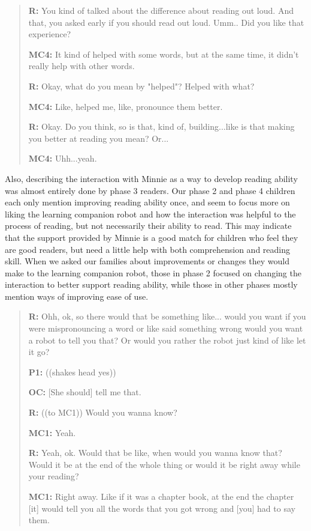 \documentclass{sigchi}
\begin{document}
	\begin{quote}
		 \vspace{2mm}
		 \textbf{R:} You kind of talked about the difference about reading out loud. And that, you asked early if you should read out loud. Umm.. Did you like that experience?
		 		 
		 \textbf{MC4:} It kind of helped with some words, but at the same time, it didn't really help with other words.
		 
		 \textbf{R:} Okay, what do you mean by "helped"? Helped with what?
		 
		 \textbf{MC4:} Like, helped me, like, pronounce them better.
		  
		 \textbf{R:} Okay. Do you think, so is that, kind of, building...like is that making you better at reading you mean? Or...
		 
		 \textbf{MC4:} Uhh...yeah. 
		 
	\end{quote}

Also, describing the interaction with Minnie as a way to develop reading ability was almost entirely done by phase 3 readers. Our phase 2 and phase 4 children each only mention improving reading ability once, and seem to focus more on liking the learning companion robot and how the interaction was helpful to the process of reading, but not necessarily their ability to read. This may indicate that the support provided by Minnie is a good match for children who feel they are good readers, but need a little help with both comprehension and reading skill. When we asked our families about improvements or changes they would make to the learning companion robot, those in phase 2 focused on changing the interaction to better support reading ability, while those in other phases mostly mention ways of improving ease of use. 

	\begin{quote}
	 \textbf{R:} Ohh, ok, so there would that be something like... would you want if you were mispronouncing a word or like said something wrong would you want a robot to tell you that? Or would you rather the robot just kind of like let it go?
	 
	 \textbf{P1:} ((shakes head yes))
	 
	 \textbf{OC:} [She should] tell me that. 
	 
	 \textbf{R:} ((to MC1)) Would you wanna know?
	 
	 \textbf{MC1:} Yeah.
	 
	 \textbf{R:} Yeah, ok. Would that be like, when would you wanna know that? Would it be at the end of the whole thing or would it be right away while your reading?
	 
	 \textbf{MC1:} Right away. Like if it was a chapter book, at the end the chapter [it] would tell you all the words that you got wrong and [you] had to say them.
	\end{quote}
\end{document}
